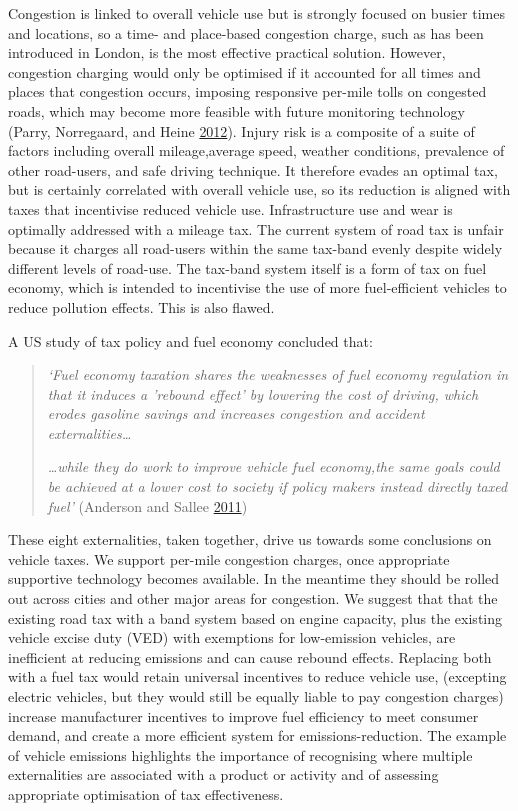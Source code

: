 \documentclass[]{tufte-handout}
\begin{document}
Congestion is linked to overall vehicle use but is strongly focused on
busier times and locations, so a time- and place-based congestion
charge, such as has been introduced in London, is the most effective
practical solution. However, congestion charging would only be optimised
if it accounted for all times and places that congestion occurs,
imposing responsive per-mile tolls on congested roads, which may become
more feasible with future monitoring technology (Parry, Norregaard, and
Heine \protect\hyperlink{ref-Parry2012}{2012}). Injury risk is a
composite of a suite of factors including overall mileage,average speed,
weather conditions, prevalence of other road-users, and safe driving
technique. It therefore evades an optimal tax, but is certainly
correlated with overall vehicle use, so its reduction is aligned with
taxes that incentivise reduced vehicle use. Infrastructure use and wear
is optimally addressed with a mileage tax. The current system of road
tax is unfair because it charges all road-users within the same tax-band
evenly despite widely different levels of road-use. The tax-band system
itself is a form of tax on fuel economy, which is intended to
incentivise the use of more fuel-efficient vehicles to reduce pollution
effects. This is also flawed.

A US study of tax policy and fuel economy concluded that:

\begin{quote}
\emph{`Fuel economy taxation shares the weaknesses of fuel economy
regulation in that it induces a 'rebound effect' by lowering the cost of
driving, which erodes gasoline savings and increases congestion and
accident externalities\ldots{}}

\emph{\ldots{}while they do work to improve vehicle fuel economy,the
same goals could be achieved at a lower cost to society if policy makers
instead directly taxed fuel'} (Anderson and Sallee
\protect\hyperlink{ref-Anderson2011}{2011})
\end{quote}

These eight externalities, taken together, drive us towards some
conclusions on vehicle taxes. We support per-mile congestion charges,
once appropriate supportive technology becomes available. In the
meantime they should be rolled out across cities and other major areas
for congestion. We suggest that that the existing road tax with a band
system based on engine capacity, plus the existing vehicle excise duty
(VED) with exemptions for low-emission vehicles, are inefficient at
reducing emissions and can cause rebound effects. Replacing both with a
fuel tax would retain universal incentives to reduce vehicle use,
(excepting electric vehicles, but they would still be equally liable to
pay congestion charges) increase manufacturer incentives to improve fuel
efficiency to meet consumer demand, and create a more efficient system
for emissions-reduction. The example of vehicle emissions highlights the
importance of recognising where multiple externalities are associated
with a product or activity and of assessing appropriate optimisation of
tax effectiveness.
\end{document}
